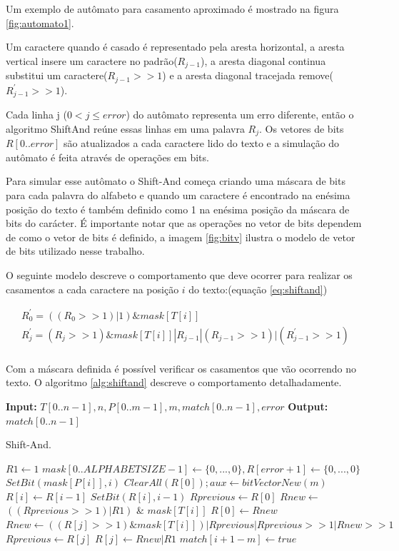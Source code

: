 \documentclass[11pt]{article}
\begin{document}
Um exemplo de autômato para casamento aproximado é mostrado na figura \ref{fig:automato1}. 

Um caractere quando é casado é representado pela aresta horizontal, a aresta vertical insere um caractere no padrão(\(R_{j-1}\)), a aresta diagonal continua substitui um caractere(\(R_{j-1}>>1\)) e a aresta diagonal tracejada remove(\(R^{'}_{j-1}>>1\)).

Cada linha j (\(0<j\leq error\)) do autômato representa um erro diferente, então o algoritmo ShiftAnd reúne essas linhas em uma palavra \(R_{j}\). Os vetores de bits \(R[0..error]\) são atualizados a cada caractere lido do texto e a simulação do autômato é feita através de operações em bits. 

Para simular esse autômato o Shift-And começa criando uma máscara de bits para cada palavra do alfabeto e quando um caractere é encontrado na enésima posição do texto é também definido como 1 na enésima posição da máscara de bits do carácter. É importante notar que as operações no vetor de bits dependem de como o vetor de bits é definido, a imagem \ref{fig:bitv} ilustra o modelo de vetor de bits utilizado nesse trabalho.

O seguinte modelo descreve o comportamento que deve ocorrer para realizar os casamentos a cada caractere na posição \(i\) do texto:(equação \ref{eq:shiftand})

\begin{equation}
\begin{aligned}
R^{'}_{0}=((R_{0}>>1)|1)\&mask[T[i]]\\
R^{'}_{j}=(R_{j}>>1)\&mask[T[i]]|R_{j-1}|(R_{j-1}>>1)|(R^{'}_{j-1}>>1)\\
\end{aligned}\label{eq:shiftand}
\end{equation}

Com a máscara definida é possível verificar os casamentos que vão ocorrendo no texto. O algoritmo \ref{alg:shiftand} descreve o comportamento detalhadamente.

\begin{algorithm}
\textbf{Input:} $T[0..n-1], n, P[0..m-1], m, match[0..n-1], error$
\textbf{Output:} $match[0..n-1]$
\caption{Shift-And.}\label{alg:shiftand}
\begin{algorithmic}[1]
\State $R1\gets 1$
\State $mask[0..ALPHABETSIZE-1]\gets \{0,...,0\},R[error+1]\gets \{0,...,0\}$
\State $SetBit(mask[P[i]],i)$
\EndFor
\State $ClearAll(R[0]); aux \gets bitVectorNew(m)$
\State $R[i]\gets R[i-1]$
\State $SetBit(R[i],i-1)$
\EndFor
{}
\State $Rprevious\gets R[0]$
\State $Rnew\gets$ $((Rprevious>>1)|R1)$ \&  $mask[T[i]]$
\State $R[0]\gets Rnew$
\State $Rnew\gets ((R[j]>>1) \& mask[T[i]]) | Rprevious | Rprevious>>1 | Rnew>>1$
\State $Rprevious\gets R[j]$
\State $R[j]\gets Rnew|R1$
\EndFor
{}
\State $match[i+1-m]\gets true$
\EndIf
\EndFor
\EndProcedure
\end{algorithmic}
\end{algorithm}
\end{document}
